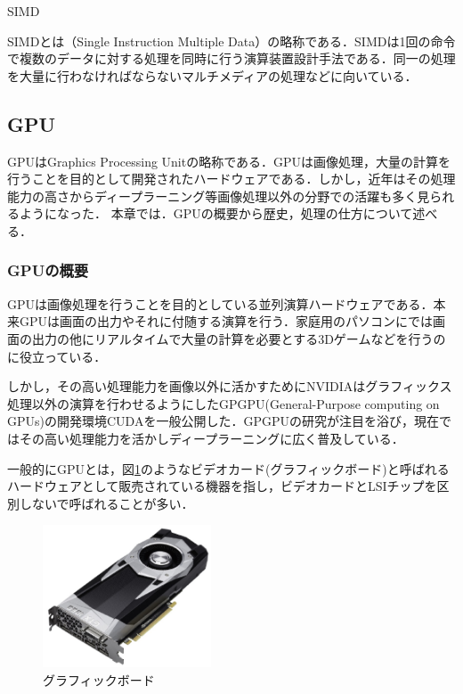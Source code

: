 \documentclass[a4j,12pt]{jsarticle}
\begin{document}
%
%
\begin{Large}
SIMD
\end{Large}

SIMDとは（Single Instruction Multiple Data）の略称である．SIMDは1回の命令で複数のデータに対する処理を同時に行う演算装置設計手法である．同一の処理を大量に行わなければならないマルチメディアの処理などに向いている．

\subsection{GPU}
GPUはGraphics Processing Unitの略称である．GPUは画像処理，大量の計算を行うことを目的として開発されたハードウェアである．しかし，近年はその処理能力の高さからディープラーニング等画像処理以外の分野での活躍も多く見られるようになった．
本章では．GPUの概要から歴史，処理の仕方について述べる．


\subsubsection{GPUの概要}
GPUは画像処理を行うことを目的としている並列演算ハードウェアである．本来GPUは画面の出力やそれに付随する演算を行う．家庭用のパソコンにでは画面の出力の他にリアルタイムで大量の計算を必要とする3Dゲームなどを行うのに役立っている．

しかし，その高い処理能力を画像以外に活かすためにNVIDIAはグラフィックス処理以外の演算を行わせるようにしたGPGPU(General-Purpose computing on GPUs)の開発環境CUDAを一般公開した．GPGPUの研究が注目を浴び，現在ではその高い処理能力を活かしディープラーニングに広く普及している．

一般的にGPUとは，図\ref{fig:gpu}のようなビデオカード(グラフィックボード)と呼ばれるハードウェアとして販売されている機器を指し，ビデオカードとLSIチップを区別しないで呼ばれることが多い．

\begin{figure}[htbp]
 \begin{center}
  \includegraphics[width=50mm]{GPU.pdf}
 \end{center}
 \caption{グラフィックボード}
 \label{fig:gpu}
\end{figure}
\end{document}
